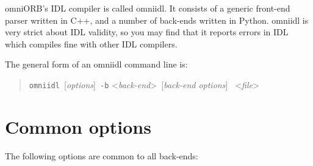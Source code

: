 \documentclass[11pt,twoside,a4paper]{book}
\newcommand{\cmdline}[1]{\texttt{#1}}
\begin{document}
omniORB's IDL compiler is called omniidl. It consists of a generic
front-end parser written in C++, and a number of back-ends written in
Python. omniidl is very strict about IDL validity, so you may find
that it reports errors in IDL which compiles fine with other IDL
compilers.

The general form of an omniidl command line is:

\begin{quote} %
\cmdline{omniidl }[\textit{options}]\cmdline{ -b}%
<\textit{back-end}>\cmdline{ }[\textit{back-end options}]%
\cmdline{ }<\textit{file}>
\end{quote}

\section{Common options}

The following options are common to all back-ends:
\end{document}
